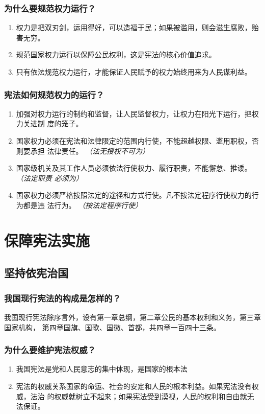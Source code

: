 \documentclass[11pt]{article}
\begin{document}
\subsubsection{为什么要规范权力运行？}
\label{sec:orgb511c63}
\begin{enumerate}
\item 权力是把双刃剑，运用得好，可以造福于民；如果被滥用，则会滋生腐败，贻害无穷。
\item 规范国家权力运行以保障公民权利，这是宪法的核心价值追求。
\item 只有依法规范权力运行，才能保证人民赋予的权力始终用来为人民谋利益。
\end{enumerate}
\subsubsection{宪法如何规范权力的运行？}
\label{sec:org2f8887c}
\begin{enumerate}
\item 加强对权力运行的制约和监督，让人民监督权力，让权力在阳光下运行，把权力关进制
度的笼子。
\item 国家权力必须在宪法和法律限定的范围内行使，不能超越权限、滥用职权，否则要承担
法律责任。 \emph{（法无授权不可为）}
\item 国家级机关及其工作人员必须依法行使权力、履行职责，不能懈怠、推诿。 \emph{（法定职责
必须为）}
\item 国家权力必须严格按照法定的途径和方式行使。凡不按法定程序行使权力的行为都是违
法行为。 \emph{（按法定程序行使）}
\end{enumerate}
\section{保障宪法实施}
\label{sec:org0627dd7}
\subsection{坚持依宪治国}
\label{sec:orge092b5c}
\subsubsection{我国现行宪法的构成是怎样的？}
\label{sec:org873e096}
我国现行宪法除序言外，设有第一章总纲，第二章公民的基本权利和义务，第三章国家机构，
第四章国旗、国歌、国徽、首都，共四章一百四十三条。
\subsubsection{为什么要维护宪法权威？}
\label{sec:orgecbf9f9}
\begin{enumerate}
\item 我国宪法是党和人民意志的集中体现，是国家的根本法
\item 宪法的权威关系国家的命运、社会的安定和人民的根本利益。如果宪法没有权威，法治
的权威就树立不起来；如果宪法受到漠视，人民的权利和自由就无法保证。
\end{enumerate}
\end{document}
